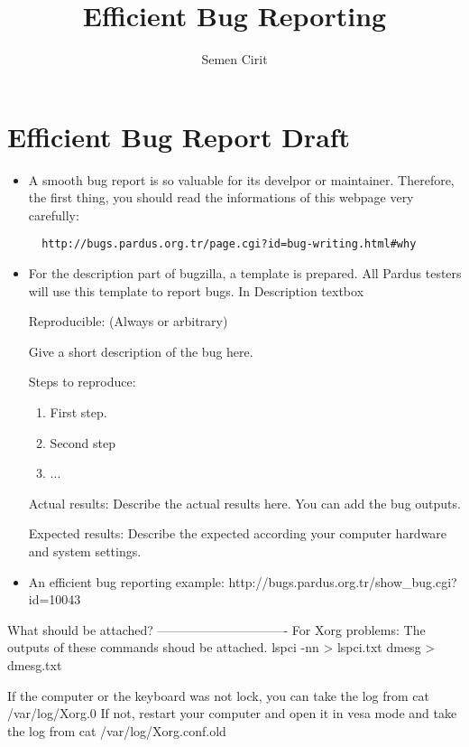 \documentclass[a4paper,10pt]{article}
\title{Efficient Bug Reporting}
\author{Semen Cirit}
\begin{document}
\maketitle

\section{Efficient Bug Report Draft}

\begin{itemize}
  \item A smooth bug report is so valuable for its develpor or maintainer. Therefore, the first thing, you should read the informations of this webpage very carefully: 
  \begin{verbatim}
  http://bugs.pardus.org.tr/page.cgi?id=bug-writing.html#why 
  \end{verbatim}
  \item For the description part of bugzilla, a template is prepared. All Pardus testers will use this template to report bugs.
  In Description textbox

   Reproducible: (Always or arbitrary)
   
    Give a short description of the bug here.
   
   Steps to reproduce:
   \begin{enumerate}
    \item First step.
    \item Second step
    \item ...
   \end{enumerate}

   Actual results:
    Describe the actual results here. You can add the bug outputs.
   
   Expected results:
    Describe the expected according your computer hardware and system settings.
    
  \item An efficient bug reporting example:
  http://bugs.pardus.org.tr/show_bug.cgi?id=10043
\end{itemize}


What should be attached?
-------------------------------
For Xorg problems:
The outputs of these commands shoud be attached.
lspci -nn > lspci.txt
dmesg > dmesg.txt

If the computer or the keyboard was not lock, you can take the log from 
cat /var/log/Xorg.0
If not, restart your computer and open it in vesa mode and take the log from
cat /var/log/Xorg.conf.old
\end{document}
